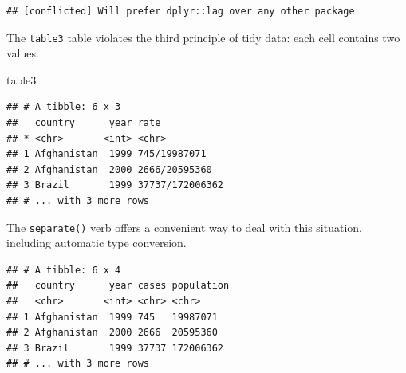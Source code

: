 \documentclass[]{book}
\newenvironment{Shaded}{}{}
\newcommand{\DataTypeTok}[1]{#1}
\newcommand{\KeywordTok}[1]{\textcolor[rgb]{0.00,0.00,1.00}{#1}}
\newcommand{\NormalTok}[1]{#1}
\newcommand{\OperatorTok}[1]{#1}
\newcommand{\OtherTok}[1]{\textcolor[rgb]{1.00,0.25,0.00}{#1}}
\newcommand{\StringTok}[1]{\textcolor[rgb]{0.00,0.50,0.50}{#1}}
\begin{document}
\begin{verbatim}
## [conflicted] Will prefer dplyr::lag over any other package
\end{verbatim}

The \texttt{table3} table violates the third principle of tidy data: each cell contains two values.

\begin{Shaded}
\begin{Highlighting}[]
\NormalTok{table3}
\end{Highlighting}
\end{Shaded}

\begin{verbatim}
## # A tibble: 6 x 3
##   country      year rate           
## * <chr>       <int> <chr>          
## 1 Afghanistan  1999 745/19987071   
## 2 Afghanistan  2000 2666/20595360  
## 3 Brazil       1999 37737/172006362
## # ... with 3 more rows
\end{verbatim}

The \texttt{separate()} verb offers a convenient way to deal with this situation, including automatic type conversion.

\begin{Shaded}
\end{Shaded}

\begin{verbatim}
## # A tibble: 6 x 4
##   country      year cases population
##   <chr>       <int> <chr> <chr>     
## 1 Afghanistan  1999 745   19987071  
## 2 Afghanistan  2000 2666  20595360  
## 3 Brazil       1999 37737 172006362 
## # ... with 3 more rows
\end{verbatim}

\begin{Shaded}
\end{Shaded}
\end{document}
